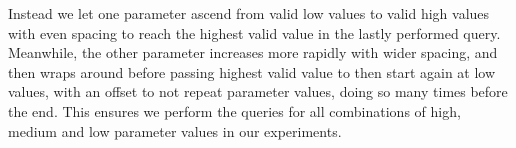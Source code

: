 Instead we let one parameter ascend from valid low values to valid high values with even spacing to reach the highest valid value in the lastly performed query. Meanwhile, the other parameter increases more rapidly with wider spacing, and then wraps around before passing highest valid value to then start again at low values, with an offset to not repeat parameter values, doing so many times before the end.
This ensures we perform the queries for all combinations of high, medium and low parameter values in our experiments.

